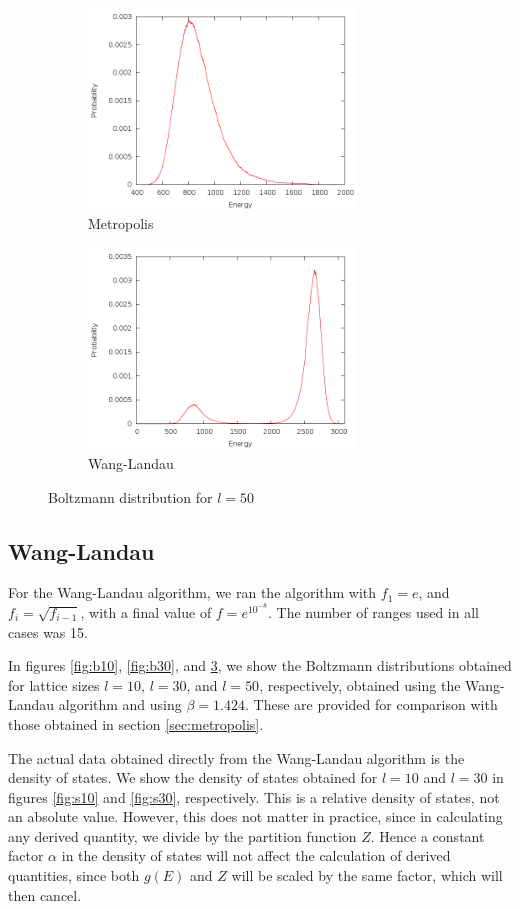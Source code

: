\documentclass{article}
\begin{document}
\begin{figure}[H]
\begin{subfigure}[t]{2.8in}
    \includegraphics[width=2.8in]{../results/metropolis/m50.png}
    \caption{Metropolis}
    \label{fig:m50}
\end{subfigure}
\quad
\begin{subfigure}[t]{2.8in}
    \includegraphics[width=2.8in]{../results/wanglandau/b50.png}
    \caption{Wang-Landau}
    \label{fig:b50}
\end{subfigure}
\caption{Boltzmann distribution for $l = 50$}
\end{figure}

\subsection{Wang-Landau}
\label{sec:wanglandau}
For the Wang-Landau algorithm, we ran the algorithm with $f_1 = e$, and $f_i = \sqrt{f_{i-1}}$, with a final value of $f = e^{10^{-8}}$.
The number of ranges used in all cases was 15.

In figures \ref{fig:b10}, \ref{fig:b30}, and \ref{fig:b50}, we show the Boltzmann distributions obtained for lattice sizes $l = 10$, $l = 30$, and $l = 50$, respectively, obtained using the Wang-Landau algorithm and using $\beta = 1.424$.
These are provided for comparison with those obtained in section \ref{sec:metropolis}.

The actual data obtained directly from the Wang-Landau algorithm is the density of states.
We show the density of states obtained for $l = 10$ and $l = 30$ in figures \ref{fig:s10} and \ref{fig:s30}, respectively.
This is a relative density of states, not an absolute value.
However, this does not matter in practice, since in calculating any derived quantity, we divide by the partition function $Z$.
Hence a constant factor $\alpha$ in the density of states will not affect the calculation of derived quantities, since both $g(E)$ and $Z$ will be scaled by the same factor, which will then cancel.
\end{document}

